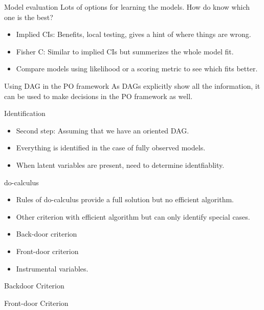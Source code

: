 \documentclass{beamer}
\begin{document}
\begin{frame}{Model evaluation}
	Lots of options for learning the models. How do know which one is the best?
	\begin{itemize}
		\item Implied CIs: Benefits, local testing, gives a hint of where things are wrong.
		\item Fisher C: Similar to implied CIs but summerizes the whole model fit.
		\item Compare models using likelihood or a scoring metric to see which fits better.
	\end{itemize}
\end{frame}

\begin{frame}{Using DAG in the PO framework}
	As DAGs explicitly show all the information, it can be used to make
	decisions in the PO framework as well.
\end{frame}

\begin{frame}{Identification}
	\begin{itemize}
		\item Second step: Assuming that we have an oriented DAG.
		\item Everything is identified in the case of fully observed models.

		\item When latent variables are present, need to determine identfiablity.
	\end{itemize}
\end{frame}

\begin{frame}{do-calculus}
	\begin{itemize}
		\item Rules of do-calculus provide a full solution but no
			efficient algorithm.
		\item Other criterion with efficient algorithm but can only
			identify special cases.
		\item Back-door criterion
		\item Front-door criterion
		\item Instrumental variables.
	\end{itemize}
\end{frame}

\begin{frame}{Backdoor Criterion}
\end{frame}

\begin{frame}{Front-door Criterion}
\end{frame}
\end{document}

